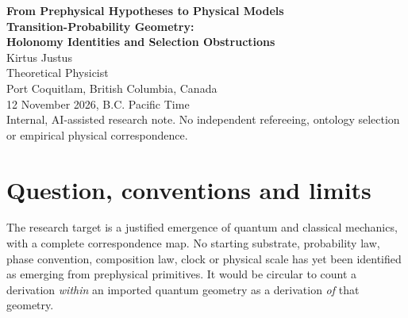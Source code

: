 \documentclass[11pt,a4paper]{article}
\newcommand{\CP}{\mathbb{CP}}
\newcommand{\RP}{\mathbb{RP}}
\begin{document}
\begin{center}
{\large\bfseries From Prephysical Hypotheses to Physical Models}\\[5pt]
{\LARGE\bfseries Transition-Probability Geometry:\\[2pt] Holonomy Identities and Selection Obstructions}\\[11pt]
{\large Kirtus Justus}\\
Theoretical Physicist\\
Port Coquitlam, British Columbia, Canada\\[5pt]
12 November 2026, B.C. Pacific Time\\[7pt]
{\footnotesize Internal, AI-assisted research note. No independent refereeing, ontology selection or empirical physical correspondence.}
\end{center}

\begin{abstract}
A determinant formula on complex projective space links Levi-Civita tangent holonomy around geodesic polygons to the Bargmann invariant. We give a local proof, and then test what this identity does \emph{not} establish. Complex conjugation preserves all transition probabilities but reverses oriented Bargmann phase. In \(\CP^2\), three fixed pairwise probabilities permit a continuous interval of triple phases. With the usual transition-probability normalization, the pure-state manifolds \(\RP^2\) (real three-level theory) and \(\CP^1\) (complex two-level theory) already differ in local curvature, independently of monodromy. Gelander's theorem rules out the Gromov--Hausdorff approximation of a positive-dimensional projective pure-state manifold by \emph{finite homogeneous metric spaces}, while explicit nonhomogeneous nets converge when the geometry is imported. Finally, classical spin provides a countermodel to the unrestricted suggestion that a symplectic pure-state manifold and vanishing third-order interference select complex quantum theory. Static projective geometry also fails to select its dynamical generator. All findings are mathematical and scoped; none supplies a prephysical--physical bridge.
\end{abstract}

\section{Question, conventions and limits}
The research target is a justified emergence of quantum and classical mechanics, with a complete correspondence map. No starting substrate, probability law, phase convention, composition law, clock or physical scale has yet been identified as emerging from prephysical primitives. It would be circular to count a derivation \emph{within} an imported quantum geometry as a derivation \emph{of} that geometry.
\end{document}
